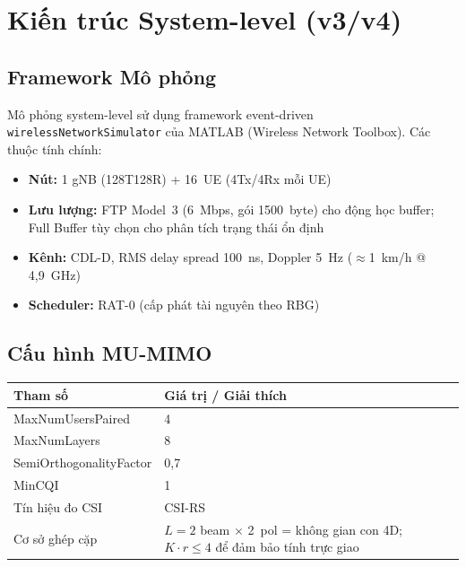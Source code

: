 \documentclass[12pt, a4paper]{article}
\begin{document}
\section{Kiến trúc System-level (v3/v4)}

\subsection{Framework Mô phỏng}

Mô phỏng system-level sử dụng framework event-driven
\texttt{wirelessNetworkSimulator} của MATLAB (Wireless Network Toolbox).
Các thuộc tính chính:

\begin{itemize}[nosep]
  \item \textbf{Nút:} 1 gNB (128T128R) + 16~UE (4Tx/4Rx mỗi UE)
  \item \textbf{Lưu lượng:} FTP Model~3 (6~Mbps, gói 1500~byte) cho
        động học buffer; Full Buffer tùy chọn cho phân tích trạng thái ổn định
  \item \textbf{Kênh:} CDL-D, RMS delay spread 100~ns,
        Doppler 5~Hz ($\approx$1~km/h @ 4,9~GHz)
  \item \textbf{Scheduler:} RAT-0 (cấp phát tài nguyên theo RBG)
\end{itemize}

\subsection{Cấu hình MU-MIMO}

\begin{center}
\begin{tabular}{L{5.5cm} L{8cm}}
\toprule
\textbf{Tham số} & \textbf{Giá trị / Giải thích} \\
\midrule
MaxNumUsersPaired       & 4 \\[3pt]
MaxNumLayers            & 8 \\[3pt]
SemiOrthogonalityFactor & 0,7 \\[3pt]
MinCQI                  & 1 \\[3pt]
Tín hiệu đo CSI         & CSI-RS \\[3pt]
Cơ sở ghép cặp          & $L=2$ beam $\times$ 2~pol = không gian con 4D;
                          $K \cdot r \leq 4$ để đảm bảo tính trực giao \\
\bottomrule
\end{tabular}
\end{center}
\end{document}
